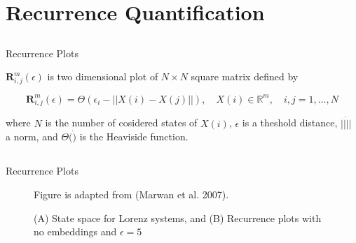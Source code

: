 
\section{Recurrence Quantification}

\subsection{}
{

\begin{frame}{Recurrence Plots}


$\mathbf{R}^{m}_{i,j} (\epsilon)$ is two dimensional plot of $N \times N$ square matrix
defined by

\begin{equation}
\mathbf{R}^{m}_{i,j} (\epsilon) = 
\Theta ( \epsilon_i - || X(i) - X(j) || ), \quad X(i) \in \mathbb{R}^m, \quad i,j=1,\dots,N
\end{equation}

where $N$ is the number of cosidered states of $X(i)$, 
$\epsilon$ is a theshold distance, 
$ || \dot ||$ a norm, and $\Theta( \dot )$ is the Heaviside function.

\end{frame}
}



\subsection{}
{

\begin{frame}{Recurrence Plots}
    \begin{figure}
		{Figure is adapted from (Marwan et al. 2007). 
		 }
	\caption{(A) State space for Lorenz systems, and 
		(B) Recurrence plots with no embeddings and $\epsilon=5$} 
   \end{figure}


\end{frame}
}

